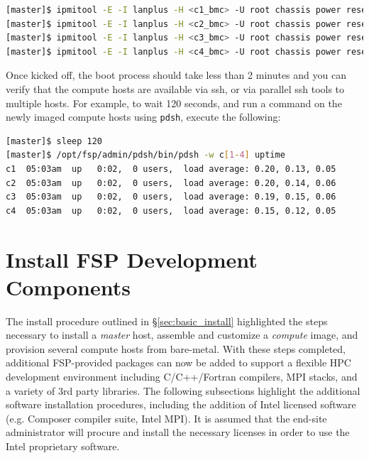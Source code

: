 \documentclass[letterpaper]{article}
\begin{document}

\begin{lstlisting}[language=bash,keywords={},upquote=true]
[master]$ ipmitool -E -I lanplus -H <c1_bmc> -U root chassis power reset   # power cycle c1
[master]$ ipmitool -E -I lanplus -H <c2_bmc> -U root chassis power reset   # power cycle c2
[master]$ ipmitool -E -I lanplus -H <c3_bmc> -U root chassis power reset   # power cycle c3
[master]$ ipmitool -E -I lanplus -H <c4_bmc> -U root chassis power reset   # power cycle c4
\end{lstlisting} 


Once kicked off, the boot process should take less than 2 minutes and you can
verify that the compute hosts are available via ssh, or via parallel ssh tools to multiple
hosts. For example, to wait 120 seconds, and run a command on the newly imaged
compute hosts using \texttt{pdsh}, execute the following:

\begin{lstlisting}[language=bash]
[master]$ sleep 120
[master]$ /opt/fsp/admin/pdsh/bin/pdsh -w c[1-4] uptime
c1  05:03am  up   0:02,  0 users,  load average: 0.20, 0.13, 0.05
c2  05:03am  up   0:02,  0 users,  load average: 0.20, 0.14, 0.06
c3  05:03am  up   0:02,  0 users,  load average: 0.19, 0.15, 0.06
c4  05:03am  up   0:02,  0 users,  load average: 0.15, 0.12, 0.05
\end{lstlisting}



\section{Install FSP Development Components}

The install procedure outlined in \S\ref{sec:basic_install}
highlighted the steps necessary to install a {\em master} host,
assemble and customize a {\em compute} image, and provision several
compute hosts from bare-metal.  With these steps completed, 
additional FSP-provided packages can now be added to support a flexible HPC
development environment including C/C++/Fortran compilers, MPI stacks, and a
variety of 3rd party libraries. The following subsections highlight the
additional software installation procedures, including the addition of Intel
licensed software (e.g. Composer compiler suite, Intel MPI). It is assumed that
the end-site administrator will procure and install the necessary licenses in
order to use the Intel proprietary software.
\end{document}
